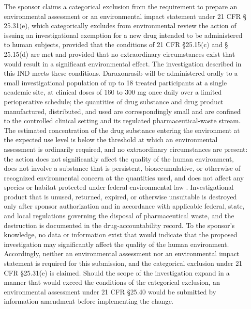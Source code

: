The sponsor claims a categorical exclusion from the requirement to prepare an
environmental assessment or an environmental impact statement under 21 CFR \S
25.31(e), which categorically excludes from environmental review the action of
issuing an investigational exemption for a new drug intended to be administered to
human subjects, provided that the conditions of 21 CFR \S 25.15(c) and \S
25.15(d) are met and provided that no extraordinary circumstances exist that would
result in a significant environmental effect. The investigation described in this
IND meets these conditions. Daraxonrasib will be administered orally to a small
investigational population of up to 18 treated participants at a single academic
site, at clinical doses of 160 to 300 mg once daily over a limited perioperative
schedule; the quantities of drug substance and drug product manufactured,
distributed, and used are correspondingly small and are confined to the
controlled clinical setting and its regulated pharmaceutical-waste stream. The
estimated concentration of the drug substance entering the environment at the
expected use level is below the threshold at which an environmental assessment is
ordinarily required, and no extraordinary circumstances are present: the action
does not significantly affect the quality of the human environment, does not
involve a substance that is persistent, bioaccumulative, or otherwise of
recognized environmental concern at the quantities used, and does not affect any
species or habitat protected under federal environmental law
\cite{phase1guidance}. Investigational product that is unused, returned,
expired, or otherwise unsuitable is destroyed only after sponsor authorization
and in accordance with applicable federal, state, and local regulations governing
the disposal of pharmaceutical waste, and the destruction is documented in the
drug-accountability record. To the sponsor's knowledge, no data or information
exist that would indicate that the proposed investigation may significantly
affect the quality of the human environment. Accordingly, neither an
environmental assessment nor an environmental impact statement is required for
this submission, and the categorical exclusion under 21 CFR \S 25.31(e) is
claimed. Should the scope of the investigation expand in a manner that would
exceed the conditions of the categorical exclusion, an environmental assessment
under 21 CFR \S 25.40 would be submitted by information amendment before
implementing the change.

